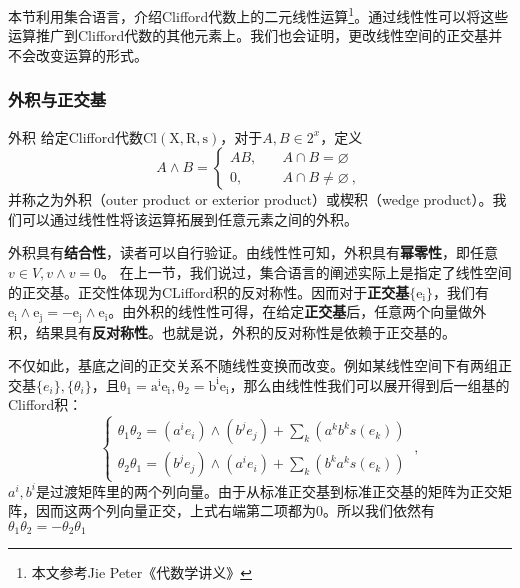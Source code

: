 



本节利用集合语言，介绍Clifford代数上的二元线性运算\footnote{本文参考Jie Peter《代数学讲义》}。通过线性性可以将这些运算推广到Clifford代数的其他元素上。我们也会证明，更改线性空间的正交基并不会改变运算的形式。
\subsubsection{外积与正交基}
\begin{definition}{外积}
给定Clifford代数$\mathrm {Cl(X,R,s)}$，对于$A,B\in 2^x$，定义
\begin{equation}
A \wedge B=\left\{\begin{aligned}
A B,\quad& A \cap B=\varnothing \\
0,\quad& A \cap B \neq \varnothing~,
\end{aligned}\right.
\end{equation}
并称之为外积（outer product or exterior product）或楔积（wedge product）。我们可以通过线性性将该运算拓展到任意元素之间的外积。
\end{definition}


外积具有\textbf{结合性}，读者可以自行验证。由线性性可知，外积具有\textbf{幂零性}，即任意$v\in V,v\wedge v=0$。
在上一节，我们说过，集合语言的阐述实际上是指定了线性空间的正交基。正交性体现为CLifford积的反对称性。因而对于\textbf{正交基}$\{\mathrm {e_i}\}$，我们有$\mathrm{e_i\wedge e_j=-e_j\wedge e_i}$。由外积的线性性可得，在给定\textbf{正交基}后，任意两个向量做外积，结果具有\textbf{反对称性}。也就是说，外积的反对称性是依赖于正交基的。


不仅如此，基底之间的正交关系不随线性变换而改变。例如某线性空间下有两组正交基$\{e_i\},\{\theta_i\}$，且$\mathrm {\theta_1=a^i e_i,\theta_2=b^i e_i}$，那么由线性性我们可以展开得到后一组基的Clifford积：
\begin{equation}
\left\{\begin{array}{l}
\theta_1 \theta_2=\left(a^i e_i\right) \wedge\left(b^j e_j\right)+\sum_k\left(a^k b^k s(e_k)\right) \\
\theta_2 \theta_1=\left(b^j e_j\right) \wedge\left(a^i e_i\right)+\sum_k\left(b^k a^k s(e_k)\right)
\end{array}\right.~,
\end{equation}
$a^i,b^i$是过渡矩阵里的两个列向量。由于从标准正交基到标准正交基的矩阵为正交矩阵，因而这两个列向量正交，上式右端第二项都为0。所以我们依然有$\theta_1\theta_2=-\theta_2\theta_1$
